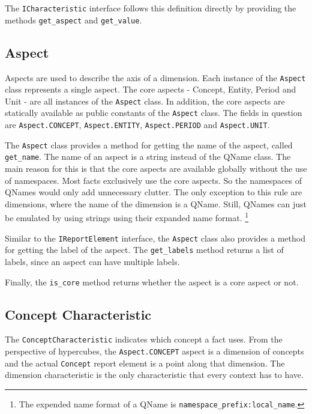The \texttt{ICharacteristic} interface follows this definition directly by providing the methods \texttt{get\_aspect} and \texttt{get\_value}.

\subsection{Aspect}

Aspects are used to describe the axis of a dimension.
Each instance of the \texttt{Aspect} class represents a single aspect.
The core aspects - Concept, Entity, Period and Unit - are all instances of the \texttt{Aspect} class.
In addition, the core aspects are statically available as public constants of the \texttt{Aspect} class.
The fields in question are \texttt{Aspect.CONCEPT}, \texttt{Aspect.ENTITY}, \texttt{Aspect.PERIOD} and \texttt{Aspect.UNIT}.

The \texttt{Aspect} class provides a method for getting the name of the aspect, called \texttt{get\_name}.
The name of an aspect is a string instead of the QName class.
The main reason for this is that the core aspects are available globally without the use of namespaces.
Most facts exclusively use the core aspects.
So the namespaces of QNames would only add unnecessary clutter.
The only exception to this rule are dimensions, where the name of the dimension is a QName.
Still, QNames can just be emulated by using strings using their expanded name format.
\footnote{The expended name format of a QName is \texttt{namespace\_prefix:local\_name}.\cite{w3_expanded_names}}
\cite{w3_qnames}

Similar to the \texttt{IReportElement} interface, the \texttt{Aspect} class also provides a method for getting the label of the aspect.
The \texttt{get\_labels} method returns a list of labels, since an aspect can have multiple labels.

Finally, the \texttt{is\_core} method returns whether the aspect is a core aspect or not.

\subsection{Concept Characteristic}

The \texttt{ConceptCharacteristic} indicates which concept a fact uses.
From the perspective of hypercubes, the \texttt{Aspect.CONCEPT} aspect is a dimension of concepts 
and the actual \texttt{Concept} report element is a point along that dimension.
The dimension characteristic is the only characteristic that every context has to have.

